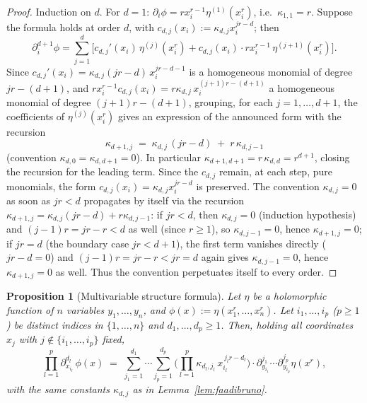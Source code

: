 \documentclass[11pt]{article}
\newtheorem{proposition}[theorem]{Proposition}
\theoremstyle{remark}
\begin{document}
\begin{proof}
Induction on $d$. For $d=1$: $\partial_i\phi=rx_i^{r-1}\eta^{(1)}(x_i^r)$, i.e.\ $\kappa_{1,1}=r$. Suppose the formula holds at order $d$, with $c_{d,j}(x_i):=\kappa_{d,j}x_i^{jr-d}$; then
\[
\partial_i^{d+1}\phi = \sum_{j=1}^d \Big[c_{d,j}'(x_i)\,\eta^{(j)}(x_i^r) + c_{d,j}(x_i)\cdot rx_i^{r-1}\,\eta^{(j+1)}(x_i^r)\Big].
\]
Since $c_{d,j}'(x_i)=\kappa_{d,j}(jr-d)\,x_i^{jr-d-1}$ is a homogeneous monomial of degree $jr-(d+1)$, and $rx_i^{r-1}c_{d,j}(x_i)=r\kappa_{d,j}\,x_i^{(j+1)r-(d+1)}$ a homogeneous monomial of degree $(j+1)r-(d+1)$, grouping, for each $j=1,\dots,d+1$, the coefficients of $\eta^{(j)}(x_i^r)$ gives an expression of the announced form with the recursion
\[
\kappa_{d+1,j} \;=\; \kappa_{d,j}\,(jr-d) \;+\; r\,\kappa_{d,j-1}
\]
(convention $\kappa_{d,0}=\kappa_{d,d+1}=0$). In particular $\kappa_{d+1,d+1}=r\,\kappa_{d,d}=r^{d+1}$, closing the recursion for the leading term. Since the $c_{d,j}$ remain, at each step, pure monomials, the form $c_{d,j}(x_i)=\kappa_{d,j}x_i^{jr-d}$ is preserved. The convention $\kappa_{d,j}=0$ as soon as $jr<d$ propagates by itself via the recursion $\kappa_{d+1,j}=\kappa_{d,j}(jr-d)+r\kappa_{d,j-1}$: if $jr<d$, then $\kappa_{d,j}=0$ (induction hypothesis) and $(j-1)r=jr-r<d$ as well (since $r\ge1$), so $\kappa_{d,j-1}=0$, hence $\kappa_{d+1,j}=0$; if $jr=d$ (the boundary case $jr<d+1$), the first term vanishes directly ($jr-d=0$) and $(j-1)r=jr-r<jr=d$ again gives $\kappa_{d,j-1}=0$, hence $\kappa_{d+1,j}=0$ as well. Thus the convention perpetuates itself to every order.
\end{proof}

\begin{proposition}[Multivariable structure formula]\label{prop:faadibruno-mixed}
Let $\eta$ be a holomorphic function of $n$ variables $y_1,\dots,y_n$, and $\phi(x):=\eta(x_1^r,\dots,x_n^r)$. Let $i_1,\dots,i_p$ ($p\ge1$) be distinct indices in $\{1,\dots,n\}$ and $d_1,\dots,d_p\ge1$. Then, holding all coordinates $x_j$ with $j\notin\{i_1,\dots,i_p\}$ fixed,
\[
\prod_{l=1}^p \partial_{x_{i_l}}^{d_l}\,\phi(x) \;=\; \sum_{j_1=1}^{d_1}\cdots\sum_{j_p=1}^{d_p} \Big(\prod_{l=1}^p \kappa_{d_l,j_l}\,x_{i_l}^{\,j_lr-d_l}\Big)\cdot \partial_{y_{i_1}}^{j_1}\cdots\partial_{y_{i_p}}^{j_p}\eta(x^r),
\]
with the same constants $\kappa_{d,j}$ as in Lemma~\ref{lem:faadibruno}.
\end{proposition}
\end{document}
